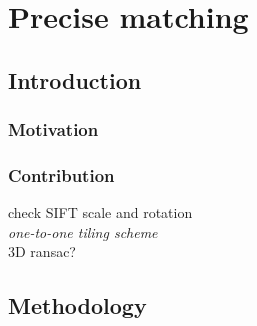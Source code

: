 
\chapter{Precise matching}
\label{chap:intro}
\minitoc

\section{Introduction}
\subsection{Motivation}
\subsection{Contribution}
check SIFT scale and rotation\\
\textit{one-to-one tiling scheme}\\
3D ransac?

\section{Methodology}

